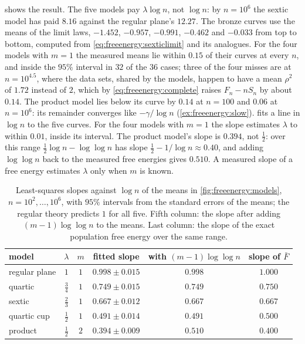 \begin{refsection}
 shows the result. The five models pay $\lambda\log n$, not $\log n$: by $n=10^6$ the sextic model has paid $8.16$ against the regular plane's $12.27$. The bronze curves use the means of the limit laws, $-1.452$, $-0.957$, $-0.991$, $-0.462$ and $-0.033$ from top to bottom, computed from \eqref{eq:freeenergy:sexticlimit} and its analogues. For the four models with $m=1$ the measured means lie within $0.15$ of their curves at every $n$, and inside the $95\%$ interval in $32$ of the $36$ cases; three of the four misses are at $n=10^{4.5}$, where the data sets, shared by the models, happen to have a mean $\rho^2$ of $1.72$ instead of $2$, which by \eqref{eq:freeenergy:complete} raises $F_n-nS_n$ by about $0.14$. The product model lies below its curve by $0.14$ at $n=100$ and $0.06$ at $n=10^6$: its remainder converges like $-\gamma/\log n$ (\cref{ex:freeenergy:slow}).  fits a line in $\log n$ to the five curves. For the four models with $m=1$ the slope estimates $\lambda$ to within $0.01$, inside its interval. The product model's slope is $0.394$, not $\tfrac12$: over this range $\tfrac12\log n-\log\log n$ has slope $\tfrac12-1/\log n\approx0.40$, and adding $\log\log n$ back to the measured free energies gives $0.510$. A measured slope of a free energy estimates $\lambda$ only when $m$ is known.

\begin{table}[t]
\centering
\small
\begin{tabular}{@{}lccccc@{}}
\toprule
model & $\lambda$ & $m$ & fitted slope & with $(m-1)\log\log n$ & slope of $\bar F$\\
\midrule
regular plane & $1$ & $1$ & $0.998\pm0.015$ & $0.998$ & $1.000$\\
quartic & $\frac34$ & $1$ & $0.749\pm0.015$ & $0.749$ & $0.750$\\
sextic & $\frac23$ & $1$ & $0.667\pm0.012$ & $0.667$ & $0.667$\\
quartic cup & $\frac12$ & $1$ & $0.491\pm0.014$ & $0.491$ & $0.500$\\
product & $\frac12$ & $2$ & $0.394\pm0.009$ & $0.510$ & $0.400$\\
\bottomrule
\end{tabular}
\caption{Least-squares slopes against $\log n$ of the means in \cref{fig:freeenergy:models}, $n=10^2,\dots,10^6$, with $95\%$ intervals from the standard errors of the means; the regular theory predicts $1$ for all five. Fifth column: the slope after adding $(m-1)\log\log n$ to the means. Last column: the slope of the exact population free energy over the same range.}\label{tab:freeenergy:slopes}
\end{table}


\end{refsection}
